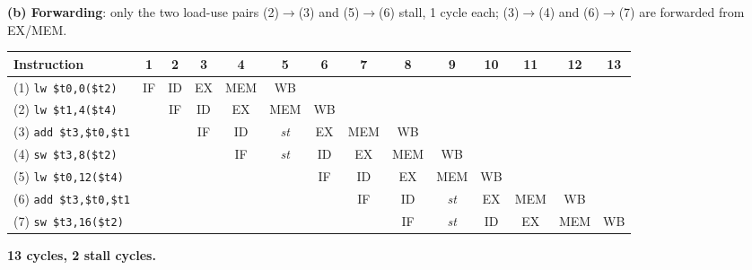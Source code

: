 \begin{solution}
\textbf{(b) Forwarding}: only the two load-use pairs (2)$\to$(3) and (5)$\to$(6)
stall, 1 cycle each; (3)$\to$(4) and (6)$\to$(7) are forwarded from EX/MEM.
\begin{center}\scriptsize\setlength{\tabcolsep}{1.6pt}
\begin{tabular}{@{}lccccccccccccc@{}}
\toprule
Instruction & 1 & 2 & 3 & 4 & 5 & 6 & 7 & 8 & 9 & 10 & 11 & 12 & 13 \\
\midrule
(1) \texttt{lw \$t0,0(\$t2)} & IF & ID & EX & MEM & WB &  &  &  &  &  &  &  &  \\
(2) \texttt{lw \$t1,4(\$t4)} &  & IF & ID & EX & MEM & WB &  &  &  &  &  &  &  \\
(3) \texttt{add \$t3,\$t0,\$t1} &  &  & IF & ID & \textit{st} & EX & MEM & WB &  &  &  &  &  \\
(4) \texttt{sw \$t3,8(\$t2)} &  &  &  & IF & \textit{st} & ID & EX & MEM & WB &  &  &  &  \\
(5) \texttt{lw \$t0,12(\$t4)} &  &  &  &  &  & IF & ID & EX & MEM & WB &  &  &  \\
(6) \texttt{add \$t3,\$t0,\$t1} &  &  &  &  &  &  & IF & ID & \textit{st} & EX & MEM & WB &  \\
(7) \texttt{sw \$t3,16(\$t2)} &  &  &  &  &  &  &  & IF & \textit{st} & ID & EX & MEM & WB \\
\bottomrule
\end{tabular}
\end{center}
\textbf{13 cycles, 2 stall cycles.}


\end{solution}
